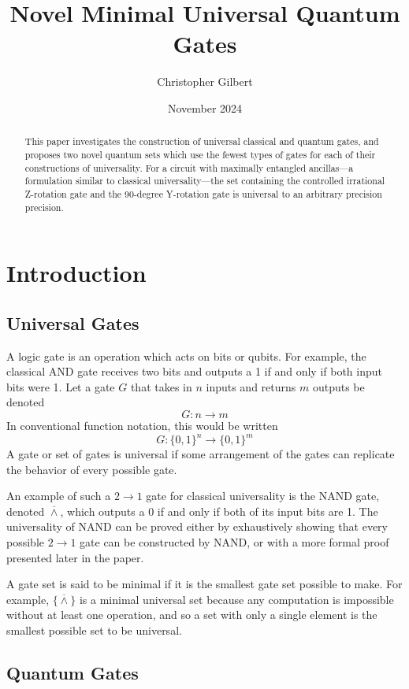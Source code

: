 \documentclass[12pt]{article}
\title{Novel Minimal Universal Quantum Gates}
\author{Christopher Gilbert}
\date{November 2024}
\newcommand{\nand}{\overline{\land}}
\begin{document}
\maketitle
\newpage

\begin{abstract}
This paper investigates the construction of universal classical and quantum gates, and proposes two novel quantum sets which use the fewest types of gates for each of their constructions of universality. For a circuit with  maximally entangled ancillas---a formulation similar to classical universality---the set containing the controlled irrational Z-rotation gate and the 90-degree Y-rotation gate is universal to an arbitrary precision precision.
\end{abstract}
\newpage

\section{Introduction}

\subsection{Universal Gates}
A logic gate is an operation which acts on bits or qubits. For example, the classical AND gate receives two bits and outputs a 1 if and only if both input bits were 1. Let a gate $G$ that takes in $n$ inputs and returns $m$ outputs be denoted
$$G : n \to m$$
In conventional function notation, this would be written
$$G : \{0, 1\}^n \to \{0, 1\}^m$$
A gate or set of gates is universal if some arrangement of the gates can replicate the behavior of every possible gate.

An example of such a $2 \to 1$ gate for classical universality is the NAND gate, denoted $\nand$, which outputs a 0 if and only if both of its input bits are 1. The universality of NAND can be proved either by exhaustively showing that every possible $2 \to 1$ gate can be constructed by NAND, or with a more formal proof presented later in the paper.

A gate set is said to be minimal if it is the smallest gate set possible to make. For example, $\{ \nand \}$ is a minimal universal set because any computation is impossible without at least one operation, and so a set with only a single element is the smallest possible set to be universal.

\subsection{Quantum Gates}
\end{document}
